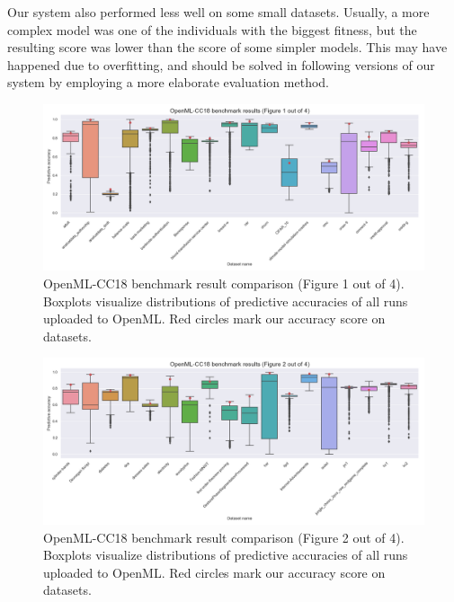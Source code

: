 Our system also performed less well on some small datasets. Usually, a more
complex model was one of the individuals with the biggest fitness, but the
resulting score was lower than the score of some simpler models. This may have
happened due to overfitting, and should be solved in following versions of our
system by employing a more elaborate evaluation method.


\begin{figure}
    \includegraphics[width=\textwidth]{../img/openml-boxplot0.png}
    \caption[OpenML-CC18 benchmark result comparison (Figure 1 out of 4)]{
    OpenML-CC18 benchmark result comparison (Figure 1 out of 4).
    Boxplots visualize distributions of predictive accuracies of all
    runs uploaded to OpenML. Red circles mark our accuracy score on datasets.}
    \label{fig:OpenML:boxplot:0}
\end{figure}

\begin{figure}
    \includegraphics[width=\textwidth]{../img/openml-boxplot1.png}
    \caption[OpenML-CC18 benchmark result comparison (Figure 2 out of 4)]{
	OpenML-CC18 benchmark result comparison (Figure 2 out of 4).    
    Boxplots visualize distributions of predictive accuracies of all
    runs uploaded to OpenML. Red circles mark our accuracy score on datasets.}
    \label{fig:OpenML:boxplot:1}
\end{figure}

